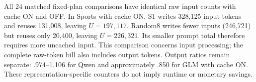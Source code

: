

All 24 matched fixed-plan comparisons have identical raw input counts with cache ON and OFF. In Sports with cache ON, S1 writes 328,125 input tokens and reuses 131,008, leaving $U=197,117$. Random8 writes fewer inputs (246,721) but reuses only 20,400, leaving $U=226,321$. Its smaller prompt total therefore requires more uncached input. This comparison concerns input processing; the complete raw-token bill also includes output tokens. Output ratios remain separate: .974--1.106 for Qwen and approximately .850 for GLM with cache ON. These representation-specific counters do not imply runtime or monetary savings.

